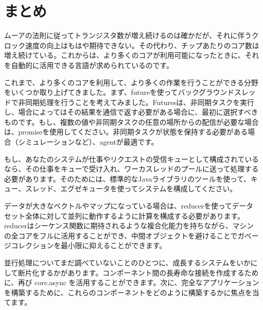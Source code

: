 \section{まとめ}

ムーアの法則に従ってトランジスタ数が増え続けるのは確かだが、それに伴うクロック速度の向上はもはや期待できない。その代わり、チップあたりのコア数は増え続けている。これからは、より多くのコアが利用可能になったときに、それを自動的に活用できる言語が求められているのです。

これまで、より多くのコアを利用して、より多くの作業を行うことができる分野をいくつか取り上げてきました。まず、futureを使ってバックグラウンドスレッドで非同期処理を行うことを考えてみました。Futuresは、非同期タスクを実行し、場合によってはその結果を通信で返す必要がある場合に、最初に選択すべきものです。もし、複数の値や非同期タスクの任意の場所からの配信が必要な場合は、promiseを使用してください。非同期タスクが状態を保持する必要がある場合（シミュレーションなど）、agentが最適です。

もし、あなたのシステムが仕事やリクエストの受信キューとして構成されているなら、その仕事をキューで受け入れ、ワーカスレッドのプールに送って処理する必要があります。そのためには、標準的なJavaライブラリのツールを使って、キュー、スレッド、エグゼキュータを使ってシステムを構成してください。

データが大きなベクトルやマップになっている場合は、reducerを使ってデータセット全体に対して並列に動作するように計算を構成する必要があります。reducerはシーケンス関数に期待されるような複合化能力を持ちながら、マシンの全コアをフルに活用することができ、中間オブジェクトを避けることでガベージコレクションを最小限に抑えることができます。

並行処理についてまだ調べていないことのひとつに、成長するシステムをいかにして断片化するかがあります。コンポーネント間の長寿命な接続を作成するために、再び core.async を活用することができます。次に、完全なアプリケーションを構築するために、これらのコンポーネントをどのように構築するかに焦点を当てます。

